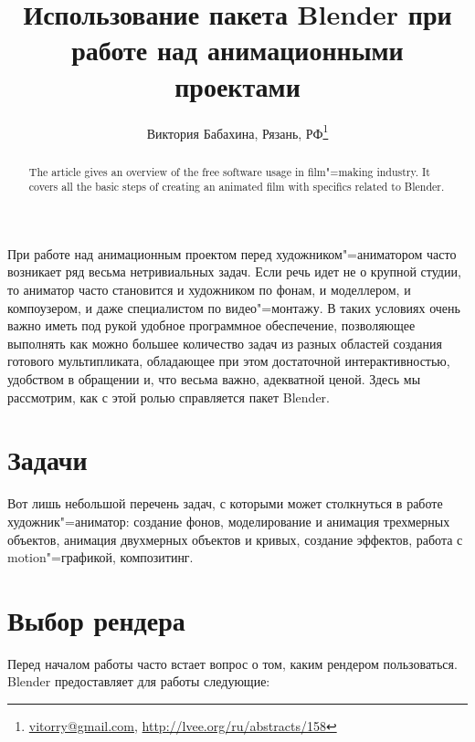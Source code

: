 \documentclass[10pt, a5paper]{article}
\begin{document}
\title{Использование пакета Blender при работе над анимационными проектами}
\author{Виктория Бабахина, Рязань, РФ\footnote{\url{vitorry@gmail.com}, \url{http://lvee.org/ru/abstracts/158}}}
\maketitle
\begin{abstract}
The article gives an overview of the free software usage in film"=making industry. It covers all the basic steps of creating an animated film with specifics related to Blender.
\end{abstract}

При работе над анимационным проектом перед художником"=аниматором часто возникает ряд весьма нетривиальных задач. Если речь идет не о крупной студии, то аниматор часто становится и художником по фонам, и моделлером, и компоузером, и даже специалистом по видео"=монтажу. В таких условиях очень важно иметь под рукой удобное программное обеспечение, позволяющее выполнять как можно большее количество задач из разных областей создания готового мультипликата, обладающее при этом достаточной интерактивностью, удобством в обращении и, что весьма важно, адекватной ценой. Здесь мы рассмотрим, как с этой ролью справляется пакет Blender.

\section*{Задачи}

Вот лишь небольшой перечень задач, с которыми может столкнуться в работе художник"=аниматор: создание фонов, моделирование и анимация трехмерных объектов, анимация двухмерных объектов и кривых, создание эффектов,  работа с motion"=графикой, 
композитинг.

\section*{Выбор рендера}

Перед началом работы часто встает вопрос о том, каким рендером пользоваться. Blender предоставляет для работы следующие:
\end{document}
